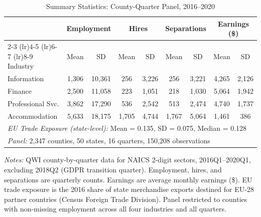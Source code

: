 \begin{table}[t]
\centering
\begin{threeparttable}
\caption{Summary Statistics: County-Quarter Panel, 2016--2020}
\label{tab:sumstats}
\small
\begin{tabular}{lcccccccc}
\toprule
 & \multicolumn{2}{c}{Employment} & \multicolumn{2}{c}{Hires} & \multicolumn{2}{c}{Separations} & \multicolumn{2}{c}{Earnings (\$)} \\
\cmidrule(lr){2-3} \cmidrule(lr){4-5} \cmidrule(lr){6-7} \cmidrule(lr){8-9}
Industry & Mean & SD & Mean & SD & Mean & SD & Mean & SD \\
\midrule
Information & 1,306 & 10,361 & 256 & 3,226 & 256 & 3,221 & 4,265 & 2,126 \\
Finance & 2,500 & 11,058 & 223 & 1,051 & 218 & 1,030 & 5,064 & 1,942 \\
Professional Svc. & 3,862 & 17,290 & 536 & 2,542 & 513 & 2,474 & 4,740 & 1,737 \\
Accommodation & 5,633 & 18,175 & 1,705 & 4,744 & 1,767 & 5,064 & 1,461 & 386 \\
\midrule
\multicolumn{9}{l}{\textit{EU Trade Exposure (state-level):} Mean = 0.135, SD = 0.075, Median = 0.128} \\
\multicolumn{9}{l}{\textit{Panel:} 2,347 counties, 50 states, 16 quarters, 150,208 observations} \\
\bottomrule
\end{tabular}
\begin{tablenotes}[flushleft]\small
\item \textit{Notes:} QWI county-by-quarter data for NAICS 2-digit sectors, 2016Q1--2020Q1, excluding 2018Q2 (GDPR transition quarter). Employment, hires, and separations are quarterly counts. Earnings are average monthly earnings (\$). EU trade exposure is the 2016 share of state merchandise exports destined for EU-28 partner countries (Census Foreign Trade Division). Panel restricted to counties with non-missing employment across all four industries and all quarters.
\end{tablenotes}
\end{threeparttable}
\end{table}
